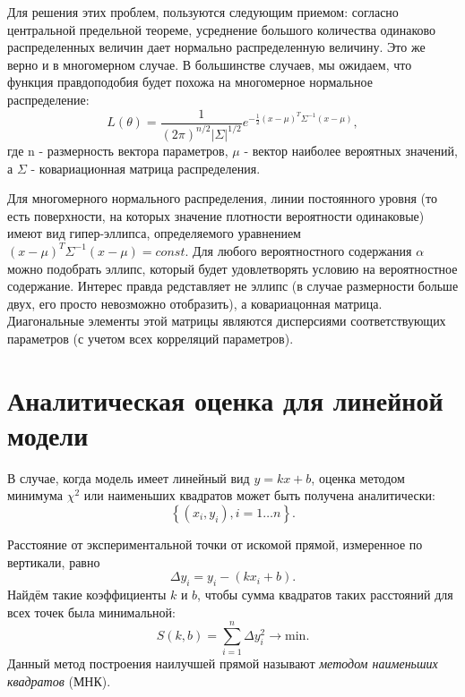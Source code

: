 Для решения этих проблем, пользуются следующим приемом: согласно
центральной предельной теореме, усреднение большого количества одинаково
распределенных величин дает нормально распределенную величину. Это же
верно и в многомерном случае. В большинстве случаев, мы ожидаем, что
функция правдоподобия будет похожа на многомерное нормальное
распределение:
\begin{equation}
    L(\theta) = \frac{1}{(2 \pi)^{n/2}\left|\Sigma\right|^{1/2}} e^{-\frac{1}{2}
(x - \mu)^T \Sigma^{-1} (x - \mu)},
\end{equation}
где n - размерность вектора параметров, $\mu$ - вектор
наиболее вероятных значений, а $\Sigma$ -
%
ковариационная матрица
распределения.

Для многомерного нормального распределения, линии постоянного уровня (то
есть поверхности, на которых значение плотности вероятности одинаковые)
имеют вид гипер-эллипса, определяемого уравнением
$(x - \mu)^T \Sigma^{-1} (x - \mu) = const$. Для любого вероятностного
содержания $\alpha$ можно подобрать эллипс, который будет
удовлетворять условию на вероятностное содержание. Интерес правда
редставляет не эллипс (в случае размерности больше двух, его просто
невозможно отобразить), а ковариацонная матрица. Диагональные элементы
этой матрицы являются дисперсиями соответствующих параметров (с учетом
всех корреляций параметров).


\section{Аналитическая оценка для линейной модели}
\label{sec:linear}

В случае, когда модель имеет линейный вид $y=kx+b$, оценка методом минимума
$\chi^2$ или наименьших квадратов может быть получена аналитически:
\[
\left\{ \left(x_{i},y_{i}\right),i=1\ldots n\right\} .
\]

Расстояние от экспериментальной точки от искомой прямой, измеренное
по вертикали, равно
\[
\Delta y_{i}=y_{i}-\left(kx_{i}+b\right).
\]
Найдём такие коэффициенты $k$ и $b$, чтобы сумма квадратов таких
расстояний для всех точек была минимальной:
\begin{equation}
S\!\left(k,b\right)=\sum\limits _{i=1}^{n}\Delta
y_{i}^{2}\to\mathrm{min}.\label{eq:mnk_S}
\end{equation}
Данный метод построения наилучшей прямой называют \emph{методом наименьших
квадратов} (МНК).

